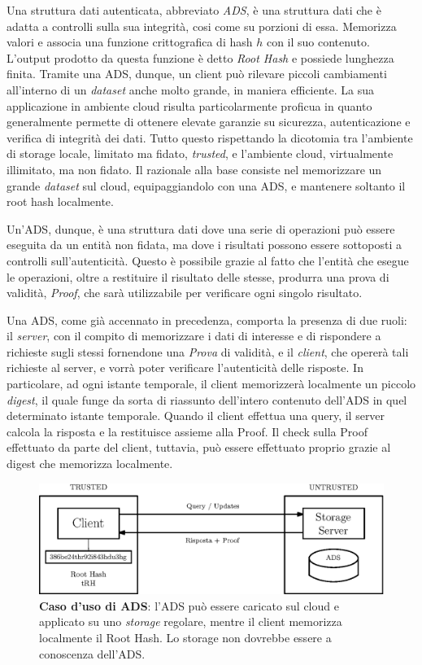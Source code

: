 		Una struttura dati autenticata, abbreviato \textit{ADS}, è una struttura dati che è adatta a controlli sulla sua integrità, cosi come su porzioni di essa. Memorizza valori e associa una funzione crittografica di hash $ h $ con il suo contenuto. L'output prodotto da questa funzione è detto \textit{Root Hash} e possiede lunghezza finita. Tramite una ADS, dunque, un client può rilevare piccoli cambiamenti all'interno di un \textit{dataset} anche molto grande, in maniera efficiente.
		La sua applicazione in ambiente cloud risulta particolarmente proficua in quanto generalmente permette di ottenere elevate garanzie su sicurezza, autenticazione e verifica di integrità dei dati. Tutto questo rispettando la dicotomia tra l'ambiente di storage locale, limitato ma fidato, \textit{trusted}, e l'ambiente cloud, virtualmente illimitato, ma non fidato. Il razionale alla base consiste nel memorizzare un grande \textit{dataset} sul cloud, equipaggiandolo con una ADS, e mantenere soltanto il root hash localmente.

		Un'ADS, dunque, è una struttura dati dove una serie di operazioni può essere eseguita da un entità non fidata, ma dove i risultati possono essere sottoposti a controlli sull'autenticità. Questo è possibile grazie al fatto che l'entità che esegue le operazioni, oltre a restituire il risultato delle stesse, produrra una prova di validità, \textit{Proof}, che sarà utilizzabile per verificare ogni singolo risultato.

		Una ADS, come già accennato in precedenza, comporta la presenza di due ruoli: il \textit{server}, con il compito di memorizzare i dati di interesse e di rispondere a richieste sugli stessi fornendone una \textit{Prova} di validità, e il \textit{client}, che opererà tali richieste al server, e vorrà poter verificare l'autenticità delle risposte. In particolare, ad ogni istante temporale, il client memorizzerà localmente un piccolo \textit{digest}, il quale funge da sorta di riassunto dell'intero contenuto dell'ADS in quel determinato istante temporale. Quando il client effettua una query, il server calcola la risposta e la restituisce assieme alla Proof. Il check sulla Proof effettuato da parte del client, tuttavia, può essere effettuato proprio grazie al digest che memorizza localmente.
		
		\begin{figure}
			\centering
			\includegraphics[scale=0.75]{figure/trusted-untrusted.eps}
			\caption{\textbf{Caso d'uso di ADS}: l'ADS può essere caricato sul cloud e applicato su uno \textit{storage} regolare, mentre il client memorizza localmente il Root Hash. Lo storage non dovrebbe essere a conoscenza dell'ADS.}\label{fig:3}
		\end{figure}
		

